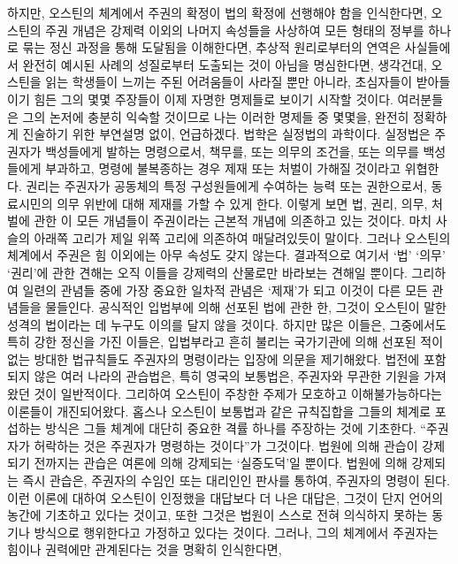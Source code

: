 하지만, 오스틴의 체계에서 주권의 확정이 법의 확정에 선행해야 함을
인식한다면,
오스틴의 주권 개념은
강제력 이외의 나머지 속성들을 사상하여
모든 형태의 정부를 하나로 묶는 정신 과정을 통해 도달됨을
이해한다면,
추상적 원리로부터의 연역은
사실들에서
완전히
예시된 사례의 성질로부터 도출되는 것이 아님을
명심한다면,
생각건대,
오스틴을 읽는 학생들이 느끼는 주된 어려움들이 사라질 뿐만 아니라,
초심자들이 받아들이기 힘든 그의 몇몇 주장들이 이제 자명한 명제들로
보이기 시작할 것이다.
여러분들은 그의 논저에 충분히 익숙할 것이므로
나는 이러한 명제들 중 몇몇을, 완전히 정확하게 진술하기 위한 부연설명 없이,
언급하겠다.
법학은 실정법의 과학이다.
실정법은 주권자가 백성들에게 발하는 명령으로서,
책무를, 또는 의무의 조건을, 또는 의무를 백성들에게 부과하고,
명령에 불복종하는 경우 제재 또는 처벌이 가해질 것이라고 위협한다.
권리는 주권자가 공동체의 특정 구성원들에게 수여하는 능력 또는 권한으로서,
동료시민의 의무 위반에 대해 제재를 가할 수 있게 한다.
이렇게 보면 법, 권리, 의무, 처벌에 관한 이 모든 개념들이
주권이라는 근본적 개념에 의존하고 있는 것이다.
마치 사슬의 아래쪽 고리가 제일 위쪽 고리에 의존하여 매달려있듯이 말이다.
그러나 오스틴의 체계에서 주권은 힘 이외에는 아무 속성도 갖지 않는다.
결과적으로 여기서 `법' `의무' `권리'에 관한 견해는 오직
이들을 강제력의 산물로만 바라보는 견해일 뿐이다.
그리하여 일련의 관념들 중에 가장 중요한 일차적 관념은 `제재'가 되고 이것이
다른 모든 관념들을 물들인다.
공식적인 입법부에 의해 선포된 법에 관한 한,
그것이 오스틴이 말한 성격의 법이라는 데 누구도 이의를 달지 않을 것이다.
하지만 많은 이들은, 그중에서도 특히 강한 정신을 가진 이들은,
입법부라고 흔히 불리는 국가기관에 의해 선포된 적이 없는 방대한 법규칙들도
주권자의 명령이라는 입장에 의문을 제기해왔다.
법전에 포함되지 않은 여러 나라의 관습법은,
특히 영국의 보통법은,
주권자와 무관한 기원을 가져왔던 것이 일반적이다.
그리하여 오스틴이 주창한 주제가 모호하고 이해불가능하다는 이론들이 개진되어왔다.
홉스나 오스틴이 보통법과 같은 규칙집합을 그들의 체계로 포섭하는 방식은
그들 체계에 대단히 중요한 격률 하나를 주장하는 것에 기초한다.
``주권자가 허락하는 것은 주권자가 명령하는 것이다''가 그것이다.
법원에 의해 관습이 강제되기 전까지는
관습은 여론에 의해 강제되는 `실증도덕'일 뿐이다.
법원에 의해 강제되는 즉시 관습은,
주권자의 수임인 또는 대리인인 판사를 통하여,
주권자의 명령이 된다.
이런 이론에 대하여 오스틴이 인정했을 대답보다 더 나은 대답은,
그것이 단지 언어의 농간에 기초하고 있다는 것이고, 또한
그것은 법원이 스스로 전혀 의식하지 못하는 동기나 방식으로 행위한다고
가정하고 있다는 것이다.
그러나,
그의 체계에서 주권자는 힘이나 권력에만 관계된다는 것을 명확히 인식한다면,

